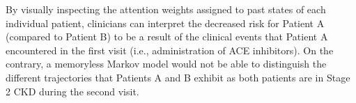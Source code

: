 \documentclass[twoside,11pt]{article}
\begin{document}
By visually inspecting the attention weights assigned to past states of each individual patient, clinicians can interpret the decreased risk for Patient A (compared to Patient B) to be a result of the clinical events that Patient A encountered in the first visit (i.e., administration of ACE inhibitors). On the contrary, a memoryless Markov model would not be able to distinguish the different trajectories that Patients A and B exhibit as both patients are in Stage 2 CKD during the second visit. 

\newpage
\nocite{*}

\end{document}
